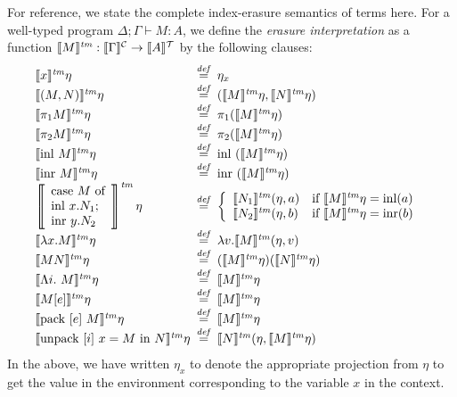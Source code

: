 For reference, we state the complete index-erasure semantics of terms
here. For a well-typed program $\Delta; \Gamma \vdash M : A$, we
define the \emph{erasure interpretation} as a function $\llbracket M \rrbracket^{\mathit{tm}} :
\llbracket \Gamma \rrbracket^{\mathcal{C}} \to \llbracket A \rrbracket^{\mathcal{T}}$ by the following clauses:
\begin{displaymath}
  \begin{array}{@{\hspace{0em}}l@{\hspace{0.5em}}c@{\hspace{0.5em}}l}
    \tmSem{x}\eta & \isDefinedAs & \eta_x \\
    \tmSem{(M,N)}\eta & \isDefinedAs & (\tmSem{M}\eta, \tmSem{N}\eta) \\
    \tmSem{\pi_1M}\eta & \isDefinedAs & \pi_1(\tmSem{M}\eta) \\
    \tmSem{\pi_2M}\eta & \isDefinedAs & \pi_2(\tmSem{M}\eta) \\
    \tmSem{\mathrm{inl}\ M}\eta & \isDefinedAs & \mathrm{inl}\ (\tmSem{M}\eta) \\
    \tmSem{\mathrm{inr}\ M}\eta & \isDefinedAs & \mathrm{inr}\ (\tmSem{M}\eta) \\
    \left\llbracket
      \begin{array}{l}
        \textrm{case}\ M\ \textrm{of}\\
        \textrm{inl}\ x.N_1;\\
        \textrm{inr}\ y.N_2
      \end{array}\right\rrbracket^{\mathit{tm}}\eta & \isDefinedAs &
    \left\{
      \begin{array}{ll}
        \tmSem{N_1}(\eta,a) & \textrm{if }\tmSem{M}\eta = \mathrm{inl}(a) \\
        \tmSem{N_2}(\eta,b) & \textrm{if }\tmSem{M}\eta = \mathrm{inr}(b)
      \end{array}
    \right. \\
    \tmSem{\lambda x. M}\eta & \isDefinedAs & \lambda v. \tmSem{M}(\eta, v) \\
    \tmSem{M N}\eta & \isDefinedAs & (\tmSem{M}\eta) (\tmSem{N}\eta) \\
    \tmSem{\Lambda i.\ M}\eta & \isDefinedAs & \tmSem{M}\eta \\
    \tmSem{M[e]}\eta & \isDefinedAs & \tmSem{M}\eta \\
    \tmSem{\mathrm{pack}\ [e]\ M}\eta & \isDefinedAs & \tmSem{M}\eta \\
    \tmSem{\mathrm{unpack}\ [i]\ x = M\ \mathrm{in}\ N}\eta & \isDefinedAs & \tmSem{N}(\eta, \tmSem{M}\eta)
  \end{array}
\end{displaymath}
In the above, we have written $\eta_x$ to denote the appropriate
projection from $\eta$ to get the value in the environment
corresponding to the variable $x$ in the context.

